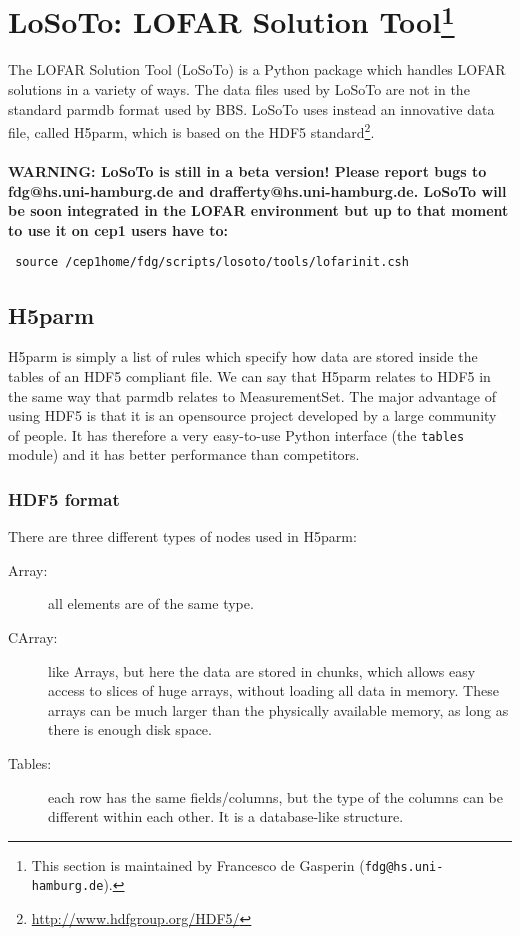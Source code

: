 \documentclass[structabstract]{article}
\begin{document}

\def \losoto {LoSoTo}

\section[LoSoTo: LOFAR Solution Tool]{\losoto: LOFAR Solution Tool\footnote{This section is maintained by Francesco de Gasperin ({\tt fdg@hs.uni-hamburg.de}).}}
\label{losoto}

The LOFAR Solution Tool (\losoto{}) is a Python package which handles LOFAR solutions in a variety of ways. The data files used by \losoto{} are not in the standard parmdb format used by BBS. \losoto{} uses instead an innovative data file, called H5parm, which is based on the HDF5 standard\footnote{\url{http://www.hdfgroup.org/HDF5/}}.
\\
\\
\textbf{WARNING: \losoto{} is still in a beta version! Please report bugs to fdg@hs.uni-hamburg.de and drafferty@hs.uni-hamburg.de. \losoto{} will be soon integrated in the LOFAR environment but up to that moment to use it on cep1 users have to:}
\begin{verbatim}
 source /cep1home/fdg/scripts/losoto/tools/lofarinit.csh
\end{verbatim}

\subsection{H5parm}
\label{losoto:h5parm}

H5parm is simply a list of rules which specify how data are stored inside the tables of an HDF5 compliant file. We can say that H5parm relates to HDF5 in the same way that parmdb relates to MeasurementSet. The major advantage of using HDF5 is that it is an opensource project developed by a large community of people. It has therefore a very easy-to-use Python interface (the \texttt{tables} module) and it has better performance than competitors.

\subsubsection{HDF5 format}
\label{losoto:HDF5}

There are three different types of nodes used in H5parm:
\begin{description}
 \item[Array:] all elements are of the same type.
 \item[CArray:] like Arrays, but here the data are stored in chunks, which allows easy access to
slices of huge arrays, without loading all data in memory. These arrays can be much
larger than the physically available memory, as long as there is enough disk space.
 \item[Tables:] each row has the same fields/columns, but the type of the columns can be different within each other. It is a database-like structure.
\end{description}
\end{document}
